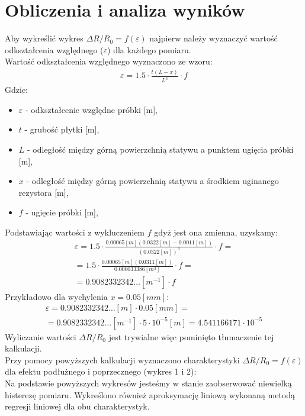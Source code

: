 \documentclass[11pt]{article}
\begin{document}
    \section{Obliczenia i analiza wyników}
    \par Aby wykreślić wykres $\Delta R/R_0=f(\varepsilon)$ najpierw należy wyznaczyć wartość odkształcenia
    względnego ($\varepsilon$) dla każdego pomiaru.\\
    \indent Wartość odkształcenia względnego wyznaczono ze wzoru:
    \begin{gather*}
        \varepsilon=1.5\cdot\frac{t(L-x)}{L^3}\cdot f
    \end{gather*}
    \indent Gdzie:
        {\footnotesize
    \begin{itemize}
        \setlength\itemsep{0em}
        \item[] \textbf{$\varepsilon$} - odkształcenie względne próbki [m],
        \item[] \textbf{$t$} - grubość płytki [m],
        \item[] \textbf{$L$} - odległość między górną powierzchnią statywu a punktem ugięcia próbki [m],
        \item[] \textbf{$x$} - odległość między górną powierzchnią statywu a środkiem uginanego rezystora [m],
        \item[] \textbf{$f$} - ugięcie próbki [m],
    \end{itemize}}
    Podstawiając wartości z wykluczeniem $f$ gdyż jest ona zmienna, uzyskamy:
    \begin{gather*}
        \varepsilon=1.5\cdot\frac{0.00065[m](0.0322[m]-0.0011[m])}{(0.0322[m])^3}\cdot f =\\
        = 1.5\cdot\frac{0.00065[m](0.0311[m])}{0.000033386[m^3]}\cdot f = \\
        = 0.9082332342\dots [m^{-1}]\cdot f
    \end{gather*}
    Przykładowo dla wychylenia $x = 0.05 [mm]$:
    \begin{gather*}
        \varepsilon=0.9082332342\dots [m]\cdot 0.05 [mm] = \\
        = 0.9082332342\dots [m^{-1}]\cdot 5\cdot 10^{-5}[m] = 4.541166171\cdot 10^{-5}
    \end{gather*}
    \indent Wyliczanie wartości $\Delta R/R_0$ jest trywialne więc pominięto tłumaczenie tej kalkulacji.\\
    \indent Przy pomocy powyższych kalkulacji wyznaczono charakterystyki $\Delta R/R_0=f(\varepsilon)$ dla efektu podłużnego i poprzecznego (wykres 1 i 2):\\
    \noindent{}
    \noindent{}
    \indent Na podstawie powyższych wykresów jesteśmy w stanie zaobserwować niewielką histerezę pomiaru. Wykreślono również
    aproksymację liniową wykonaną metodą regresji liniowej dla obu charakterystyk. \\
\end{document}
